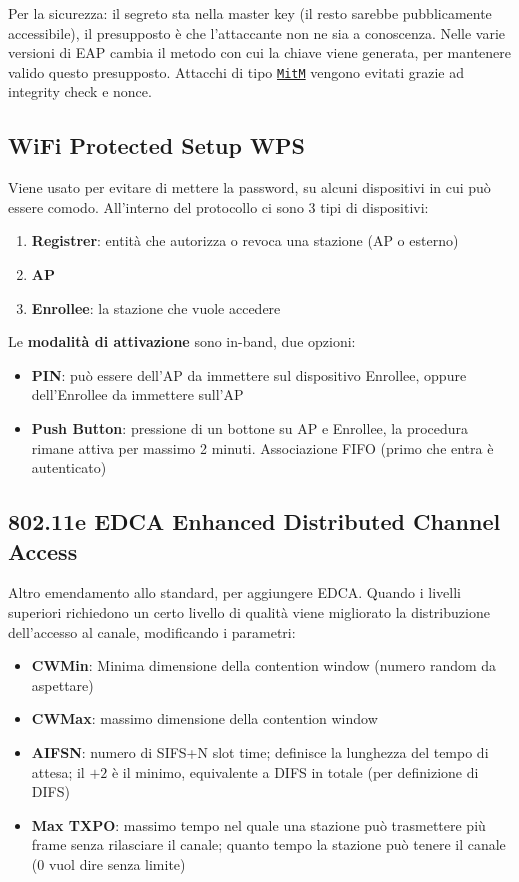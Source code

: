 Per la sicurezza: il segreto sta nella master key (il resto sarebbe pubblicamente accessibile), il presupposto è che l'attaccante non ne sia a conoscenza. Nelle varie versioni di EAP cambia il metodo con cui la chiave viene generata, per mantenere valido questo presupposto. Attacchi di tipo \href{https://it.wikipedia.org/wiki/Attacco_man_in_the_middle}{\texttt{MitM}} vengono evitati grazie ad integrity check e nonce.

\subsection{WiFi Protected Setup WPS}
Viene usato per evitare di mettere la password, su alcuni dispositivi in cui può essere comodo. All'interno del protocollo ci sono 3 tipi di dispositivi: 
\begin{enumerate}
	\item \textbf{Registrer}: entità che autorizza o revoca una stazione (AP o esterno)
	\item \textbf{AP}
	\item \textbf{Enrollee}: la stazione che vuole accedere
\end{enumerate}

Le \textbf{modalità di attivazione} sono in-band, due opzioni: 
\begin{itemize}
	\item \textbf{PIN}: può essere dell'AP da immettere sul dispositivo Enrollee, oppure dell'Enrollee da immettere sull'AP
	\item \textbf{Push Button}: pressione di un bottone su AP e Enrollee, la procedura rimane attiva per massimo 2 minuti. Associazione FIFO (primo che entra è autenticato)
\end{itemize}

\subsection{802.11e EDCA Enhanced Distributed Channel Access}

Altro emendamento allo standard, per aggiungere EDCA. Quando i livelli superiori richiedono un certo livello di qualità viene migliorato la distribuzione dell'accesso al canale, modificando i parametri: 
\begin{itemize}
	\item \textbf{CWMin}: Minima dimensione della contention window (numero random da aspettare)
	\item \textbf{CWMax}: massimo dimensione della contention window
	\item \textbf{AIFSN}: numero di SIFS+N slot time; definisce la lunghezza del tempo di attesa; il $+2$ è il minimo, equivalente a DIFS in totale (per definizione di DIFS)
	\item \textbf{Max TXPO}: massimo tempo nel quale una stazione può trasmettere più frame senza rilasciare il canale; quanto tempo la stazione può tenere il canale (0 vuol dire senza limite)
\end{itemize}

